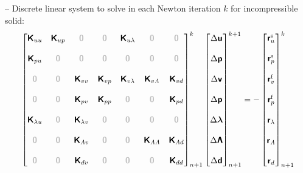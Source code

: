 \documentclass[a4paper,12pt]{report}
\newcommand{\bs}[1]{\boldsymbol{#1}}
\newcommand{\zerom}{\textcolor{lightgray}{\bs{\mathsf{0}}}}
\newcommand{\ROP}{\bs{\mathsf{r}}}
\newcommand{\LM}{\bs{\mathsf{\lambda}}}
\newcommand{\LMZ}{\bs{\mathsf{\Lambda}}}
\newcommand{\lmi}{\lambda} %
\newcommand{\lmzi}{\mathit{\Lambda}} %
\begin{document}
-- Discrete linear system to solve in each Newton iteration $k$ for incompressible solid:
\begin{align}
\begin{bmatrix} \bs{\mathsf{K}}_{uu} & \bs{\mathsf{K}}_{up} & \zerom & \zerom & \bs{\mathsf{K}}_{u\lmi} & \zerom & \zerom \\ \\ \bs{\mathsf{K}}_{pu} & \zerom & \zerom & \zerom & \zerom & \zerom & \zerom \\ \\ \zerom & \zerom & \bs{\mathsf{K}}_{vv} & \bs{\mathsf{K}}_{vp} & \bs{\mathsf{K}}_{v\lmi} & \bs{\mathsf{K}}_{v\lmzi} & \bs{\mathsf{K}}_{vd} \\ \\ \zerom & \zerom & \bs{\mathsf{K}}_{pv} & \bs{\mathsf{K}}_{pp} & \zerom & \zerom & \bs{\mathsf{K}}_{pd} \\ \\ \bs{\mathsf{K}}_{\lmi u} & \zerom & \bs{\mathsf{K}}_{\lmi v} & \zerom & \zerom & \zerom & \zerom \\ \\ \zerom & \zerom & \bs{\mathsf{K}}_{\lmzi v} & \zerom & \zerom & \bs{\mathsf{K}}_{\lmzi \lmzi} & \bs{\mathsf{K}}_{\lmzi d} \\ \\ \zerom &  \zerom & \bs{\mathsf{K}}_{dv}  & \zerom & \zerom & \zerom & \bs{\mathsf{K}}_{dd} \end{bmatrix}_{n+1}^{k}\begin{bmatrix} \Delta\bs{\mathsf{u}} \\ \\ \Delta\bs{\mathsf{p}} \\ \\ \Delta\bs{\mathsf{v}} \\ \\ \Delta\bs{\mathsf{p}} \\ \\ \Delta\LM \\ \\ \Delta\LMZ \\ \\ \Delta\bs{\mathsf{d}} \end{bmatrix}_{n+1}^{k+1}=-\begin{bmatrix} \ROP_{u}^{\mathrm{s}} \\ \\ \ROP_{p}^{\mathrm{s}} \\ \\ \ROP_{v}^{\mathrm{f}} \\ \\ \ROP_{p}^{\mathrm{f}} \\ \\ \ROP_{\lmi} \\ \\ \ROP_{\lmzi} \\ \\ \ROP_{d}\end{bmatrix}_{n+1}^{k} \label{eq:lin_sys_fsi_0d_inc}
\end{align}
\end{document}
